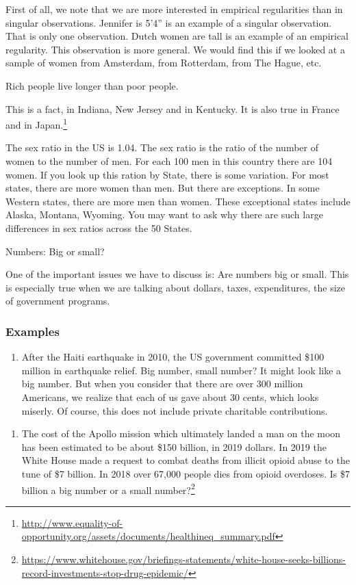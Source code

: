 \documentclass[
]{book}
\providecommand{\tightlist}{%
  \setlength{\itemsep}{0pt}\setlength{\parskip}{0pt}}
\begin{document}
First of all, we note that we are more interested in empirical regularities than in singular observations. Jennifer is 5'4'' is an example of a singular observation. That is only one observation. Dutch women are tall is an example of an empirical regularity. This observation is more general. We would find this if we looked at a sample of women from Amsterdam, from Rotterdam, from The Hague, etc.

Rich people live longer than poor people.

This is a fact, in Indiana, New Jersey and in Kentucky. It is also true in France and in Japan.\footnote{\url{http://www.equality-of-opportunity.org/assets/documents/healthineq_summary.pdf}}

The sex ratio in the US is 1.04. The sex ratio is the ratio of the number of women to the number of men. For each 100 men in this country there are 104 women. If you look up this ration by State, there is some variation. For most states, there are more women than men. But there are exceptions. In some Western states, there are more men than women. These exceptional states include Alaska, Montana, Wyoming. You may want to ask why there are such large differences in sex ratios across the 50 States.

Numbers: Big or small?

One of the important issues we have to discuss is: Are numbers big or small. This is especially true when we are talking about dollars, taxes, expenditures, the size of government programs.

\hypertarget{examples}{%
\subsubsection{Examples}\label{examples}}

\begin{enumerate}
\def\labelenumi{\arabic{enumi}.}
\tightlist
\item
  After the Haiti earthquake in 2010, the US government committed \$100 million in earthquake relief. Big number, small number? It might look like a big number. But when you consider that there are over 300 million Americans, we realize that each of us gave about 30 cents, which looks miserly. Of course, this does not include private charitable contributions.
\end{enumerate}

\begin{enumerate}
\def\labelenumi{\arabic{enumi}.}
\setcounter{enumi}{1}
\tightlist
\item
  The cost of the Apollo mission which ultimately landed a man on the moon has been estimated to be about \$150 billion, in 2019 dollars. In 2019 the White House made a request to combat deaths from illicit opioid abuse to the tune of \$7 billion. In 2018 over 67,000 people dies from opioid overdoses. Is \$7 billion a big number or a small number?\footnote{\url{https://www.whitehouse.gov/briefings-statements/white-house-seeks-billions-record-investments-stop-drug-epidemic/}}
\end{enumerate}
\end{document}
